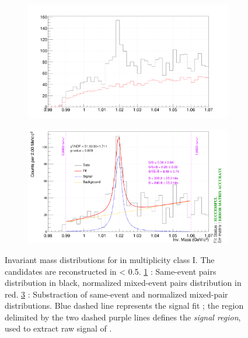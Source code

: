 \begin{figure}[h]
	\centering
	\begin{subfigure}[b]{.45\linewidth}
         \centering
         \includegraphics[width=1.2\textwidth, angle=0, clip=true, trim=0cm 0 0 0]{Figures/Sec04_TrackSelections/Phi+EvtMixing.png} 
         \caption{ }
         \label{fig:InvMassPhi+Mixed}
    \end{subfigure}
    \hfill
    \begin{subfigure}[b]{.45\linewidth}
         \centering
         \includegraphics[width=1.1\textwidth, angle=0, clip=true, trim=0cm 0 0 0cm]{Figures/Sec04_TrackSelections/InvMassPhi.png}
         \caption{ }
         \label{fig:InvMassPhiSub} 
    \end{subfigure}
    \hfill
\caption{Invariant mass distributions for \rmPhiMes in multiplicity class I. The candidates are reconstructed in \absrap < 0.5. \fig \ref{fig:InvMassPhi+Mixed} : Same-event pairs distribution in black, normalized mixed-event pairs distribution in red. \fig \ref{fig:InvMassPhi} : Substraction of same-event and normalized mixed-pair distributions. Blue dashed line represents the signal fit ; the region delimited by the two dashed purple lines defines the \textit{signal region}, used to extract raw signal of \rmPhiMes.}
	\label{fig:InvMassPhi}
\end{figure}


